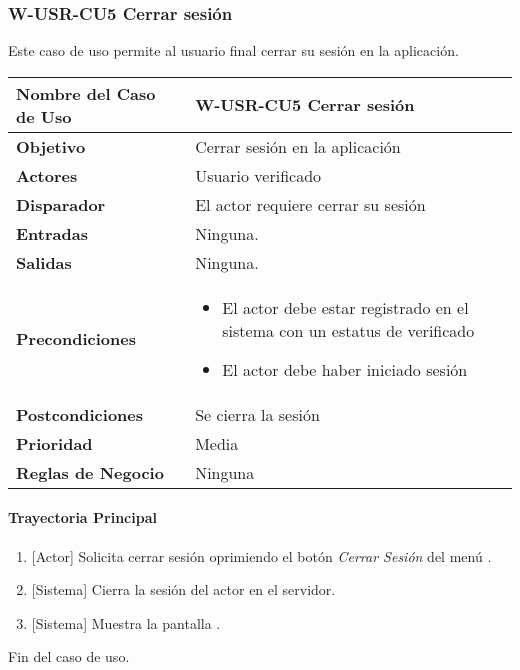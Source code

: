 \subsubsection{W-USR-CU5 Cerrar sesión}
Este caso de uso permite al usuario final cerrar su sesión en la aplicación.

\begin{longtable}{|J{5cm}|J{10.3cm}|}
	\hline
	\textbf{Nombre del Caso de Uso} &
		W-USR-CU5 Cerrar sesión \\ \hline
	\textbf{Objetivo} &
		Cerrar sesión en la aplicación \\ \hline
	\textbf{Actores} &
		Usuario verificado \\ \hline 
	\textbf{Disparador} & 
		El actor requiere cerrar su sesión \\ \hline 
	\textbf{Entradas} & 
		Ninguna. \\ \hline 
	\textbf{Salidas} & 
		Ninguna. \\ \hline
	\textbf{Precondiciones} &
		\begin{itemize}
		    \item El actor debe estar registrado en el sistema con un estatus de verificado
		    \item El actor debe haber iniciado sesión
		\end{itemize} \\ \hline
	\textbf{Postcondiciones} &
	        Se cierra la sesión \\ \hline
	\textbf{Prioridad} & 
		Media \\ \hline
	\textbf{Reglas de Negocio} & 
		Ninguna \\ \hline

\end{longtable}

\paragraph{Trayectoria Principal}
\label{W-USR-CU5}
	\begin{enumerate}
	    \item {[Actor]} Solicita cerrar sesión oprimiendo el botón \textit{Cerrar Sesión} del menú \textbf{}.
	    
	    \item {[Sistema]} Cierra la sesión del actor en el servidor.
	    
	    \item {[Sistema]} Muestra la pantalla \textbf{}.
	\end{enumerate}
	Fin del caso de uso.
